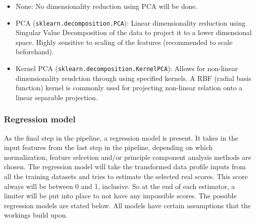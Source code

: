 \begin{itemize}
	\item None: No dimensionality reduction using PCA will be done.
	\item PCA (\verb|sklearn.decomposition.PCA|): Linear dimensionality reduction using Singular Value Decomposition of the data to project it to a lower dimensional space. Highly sensitive to scaling of the features (recommended to scale beforehand).
	\item Kernel PCA (\verb|sklearn.decomposition.KernelPCA|): Allows for non-linear dimensionality reudction through using specified kernels. A RBF (radial basis function) kernel is commonly used for projecting non-linear relation onto a linear separable projection.
\end{itemize}

\subsubsection{Regression model}
As the final step in the pipeline, a regression model is present. It takes in the input features from the last step in the pipeline, depending on which normalization, feature selcetion and/or principle component analysis methods are chosen. The regression model will take the transformed data profile inputs from all the training datasets and tries to estimate the selected real scores. This score always will be between 0 and 1, inclusive. So at the end of each estimator, a limiter will be put into place to not have any impossible scores. The possible regression models are stated below. All models have certain assumptions that the workings build upon. 

